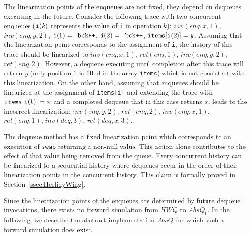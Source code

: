 The linearization points of the enqueues are not fixed, they depend on dequeues executing in the future. Consider the following trace with two concurrent enqueues (${\tt i}(k)$ represents the value of {\tt i} in operation $k$): $inv(enq,x,1)$, $inv(enq,y,2)$, ${\tt i}(1) = \mbox{{\tt bck++}}$, ${\tt i}(2) = \mbox{{\tt bck++}}$, ${\tt items[i(}2{\tt )]} = y$.
Assuming that the linearization point corresponds to the assignment of {\tt i}, the history of this trace should be linearized to $inv(enq,x,1)$, $ret(enq,1)$, $inv(enq,y,2)$, $ret(enq,2)$. However, a dequeue executing until completion after this trace will return $y$ (only position $1$ is filled in the array {\tt items}) which is not consistent with this linearization. On the other hand, assuming that enqueues should be linearized at the assignment of {\tt items[i]} and extending the trace with ${\tt items[i(}1{\tt )]} = x$ and a completed dequeue that in this case returns $x$, leads to the incorrect linearization: $inv(enq,y,2)$, $ret(enq,2)$, $inv(enq,x,1)$, $ret(enq,1)$, $inv(deq,3)$, $ret(deq,x,3)$.

The dequeue method has a fixed linearization point which corresponds to an execution of {\tt swap} returning a non-null value. This action alone contributes to the effect of that value being removed from the queue. Every concurrent history can be linearized to a sequential history where dequeues occur in the order of their linearization points in the concurrent history.
This claim is formally proved in Section~\ref{ssec:HerlihyWing}.

Since the linearization points of the enqueues are determined by future dequeue invocations, there exists no forward simulation from $\mathit{HWQ}$ to $AbsQ_0$.
In the following, we describe the abstract implementation $AbsQ$ for which such a forward simulation does exist.


